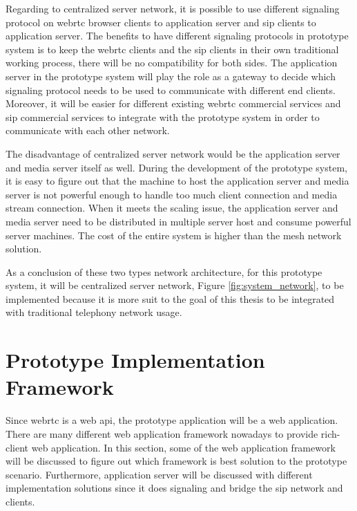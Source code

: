 \par Regarding to centralized server network, it is possible to use different signaling protocol on \gls{webrtc} browser clients to application server and \gls{sip} clients to application server. The benefits to have different signaling protocols in prototype system is to keep the \gls{webrtc} clients and the \gls{sip} clients in their own traditional working process, there will be no compatibility for both sides. The application server in the prototype system will play the role as a gateway to decide which signaling protocol needs to be used to communicate with different end clients. Moreover, it will be easier for different existing \gls{webrtc} commercial services and \gls{sip} commercial services to integrate with the prototype system in order to communicate with each other network.

\par The disadvantage of centralized server network would be the application server and media server itself as well. During the development of the prototype system, it is easy to figure out that the machine to host the application server and media server is not powerful enough to handle too much client connection and media stream connection. When it meets the scaling issue, the application server and media server need to be distributed in multiple server host and consume powerful server machines. The cost of the entire system is higher than the mesh network solution.

\par As a conclusion of these two types network architecture, for this prototype system, it will be centralized server network, Figure \ref{fig:system_network}, to be implemented because it is more suit to the goal of this thesis to be integrated with traditional telephony network usage.

\section{Prototype Implementation Framework}

\noindent Since \gls{webrtc} is a web \gls{api}, the prototype application will be a web application. There are many different web application framework nowadays to provide rich-client web application. In this section, some of the web application framework will be discussed to figure out which framework is best solution to the prototype scenario. Furthermore, application server will be discussed with different implementation solutions since it does signaling and bridge the \gls{sip} network and clients.

